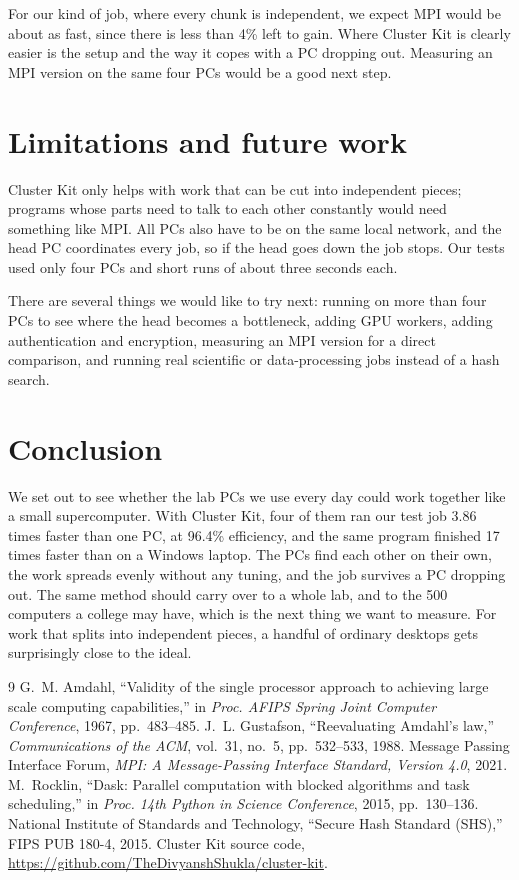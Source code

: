 \documentclass[11pt,a4paper]{article}
\let\oldsection\section
\renewcommand{\section}{\Needspace{6\baselineskip}\oldsection}
\begin{document}
For our kind of job, where every chunk is independent, we expect MPI would be about as fast, since there is less than 4\% left to gain. Where Cluster Kit is clearly easier is the setup and the way it copes with a PC dropping out. Measuring an MPI version on the same four PCs would be a good next step.

\section{Limitations and future work}
Cluster Kit only helps with work that can be cut into independent pieces; programs whose parts need to talk to each other constantly would need something like MPI. All PCs also have to be on the same local network, and the head PC coordinates every job, so if the head goes down the job stops. Our tests used only four PCs and short runs of about three seconds each.

There are several things we would like to try next: running on more than four PCs to see where the head becomes a bottleneck, adding GPU workers, adding authentication and encryption, measuring an MPI version for a direct comparison, and running real scientific or data-processing jobs instead of a hash search.

\section{Conclusion}
We set out to see whether the lab PCs we use every day could work together like a small supercomputer. With Cluster Kit, four of them ran our test job 3.86 times faster than one PC, at 96.4\% efficiency, and the same program finished 17 times faster than on a Windows laptop. The PCs find each other on their own, the work spreads evenly without any tuning, and the job survives a PC dropping out. The same method should carry over to a whole lab, and to the 500 computers a college may have, which is the next thing we want to measure. For work that splits into independent pieces, a handful of ordinary desktops gets surprisingly close to the ideal.

{\footnotesize\setlength{\itemsep}{0pt}\setlength{\parskip}{1pt}
\begin{thebibliography}{9}
 G.~M. Amdahl, \enquote{Validity of the single processor approach to achieving large scale computing capabilities,} in \emph{Proc. AFIPS Spring Joint Computer Conference}, 1967, pp.~483--485.
 J.~L. Gustafson, \enquote{Reevaluating Amdahl's law,} \emph{Communications of the ACM}, vol.~31, no.~5, pp.~532--533, 1988.
 Message Passing Interface Forum, \emph{MPI: A Message-Passing Interface Standard, Version 4.0}, 2021.
 M.~Rocklin, \enquote{Dask: Parallel computation with blocked algorithms and task scheduling,} in \emph{Proc. 14th Python in Science Conference}, 2015, pp.~130--136.
 National Institute of Standards and Technology, \enquote{Secure Hash Standard (SHS),} FIPS PUB 180-4, 2015.
 Cluster Kit source code, \url{https://github.com/TheDivyanshShukla/cluster-kit}.
\end{thebibliography}}
\end{document}
